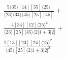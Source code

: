 \documentclass[varwidth, border=5pt]{standalone}
\begin{document}
\begin{my}
$\begin{gathered}
\scriptscriptstyle\frac{5⟨35⟩[14][35]⟨25⟩}{⟨23⟩⟨34⟩⟨45⟩[25][45]}+\\
\scriptscriptstyle\frac{4[34][12]⟨25⟩^2}{⟨23⟩[25]⟨45⟩⟨2|1+3|2]}+\\
\scriptscriptstyle\frac{1[13][23][24]⟨25⟩^2}{⟨45⟩[25]⟨2|1+3|2]^2}\phantom{+}
\end{gathered}$
\end{my}
\end{document}
